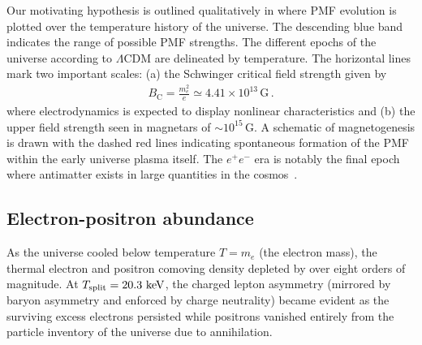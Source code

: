 Our motivating hypothesis is outlined qualitatively in  where PMF evolution is plotted over the temperature history of the universe. The descending blue band indicates the range of possible PMF strengths. The different epochs of the universe according to $\Lambda\mathrm{CDM}$ are delineated by temperature. The horizontal lines mark two important scales: (a) the Schwinger critical field strength given by
\begin{align}
    \label{crit:1}
    B_\mathrm{C} = \frac{m_{e}^{2}}{e}\simeq4.41\times10^{13}\,\mathrm{G}\,.
\end{align}
where electrodynamics is expected to display nonlinear characteristics and (b) the upper field strength seen in magnetars of $\sim10^{15}\,\mathrm{G}$. A schematic of magnetogenesis is drawn with the dashed red lines indicating spontaneous formation of the PMF within the early universe plasma itself. The $e^{+}e^{-}$ era is notably the final epoch where antimatter exists in large quantities in the cosmos~\cite{Rafelski:2023emw}.

\subsection{Electron-positron abundance}
\label{sec:abundance}
\noindent As the universe cooled below temperature $T\!=\!m_{e}$ (the electron mass), the thermal electron and positron comoving density depleted by over eight orders of magnitude. At $T_\mathrm{split}=20.3\text{ keV}$, the charged lepton asymmetry (mirrored by baryon asymmetry and enforced by charge neutrality) became evident as the surviving excess electrons persisted while positrons vanished entirely from the particle inventory of the universe due to annihilation.

